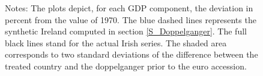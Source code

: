 \documentclass[12pt]{article}
\newcommand{\annote}[1]{\parbox{\textwidth}{\renewcommand{\baselinestretch}{1.0}\vspace{12pt} \small Notes: #1}}
\begin{document}
\begin{appendices}
\begin{figure}[h!]
    \annote{The plots depict, for each GDP component, the deviation in percent from the value of 1970. The blue dashed lines represents the synthetic Ireland computed in section \ref{S_Doppelganger}. The full black lines stand for the actual Irish series. The shaded area corresponds to two standard deviations of the difference between the treated country and the doppelganger prior to the euro accession. }
\end{figure}


\end{appendices}
\end{document}
